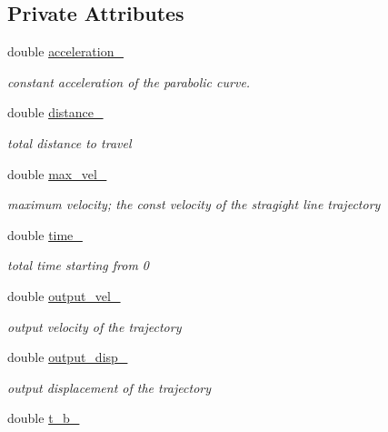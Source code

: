 \subsection*{Private Attributes}
\begin{DoxyCompactItemize}
\item 
double \hyperlink{classnubot_1_1para__traj__planning_ac2f88068a317316a2e483be7d75a71b8}{acceleration\-\_\-}
\begin{DoxyCompactList}\small\item\em constant acceleration of the parabolic curve. \end{DoxyCompactList}\item 
double \hyperlink{classnubot_1_1para__traj__planning_a6115be17c446c1a2437b5575baf3f5a8}{distance\-\_\-}
\begin{DoxyCompactList}\small\item\em total distance to travel \end{DoxyCompactList}\item 
double \hyperlink{classnubot_1_1para__traj__planning_a1ae8b889bdbb7716e9fbb5821328e4d1}{max\-\_\-vel\-\_\-}
\begin{DoxyCompactList}\small\item\em maximum velocity; the const velocity of the stragight line trajectory \end{DoxyCompactList}\item 
double \hyperlink{classnubot_1_1para__traj__planning_a06fe0c4fbd1afaa2a33672a85705410a}{time\-\_\-}
\begin{DoxyCompactList}\small\item\em total time starting from 0 \end{DoxyCompactList}\item 
double \hyperlink{classnubot_1_1para__traj__planning_ae57f0165c2b073b880bf4827bdd76204}{output\-\_\-vel\-\_\-}
\begin{DoxyCompactList}\small\item\em output velocity of the trajectory \end{DoxyCompactList}\item 
double \hyperlink{classnubot_1_1para__traj__planning_a9095bac66ff724f1b9b9c366546f2b36}{output\-\_\-disp\-\_\-}
\begin{DoxyCompactList}\small\item\em output displacement of the trajectory \end{DoxyCompactList}\item 
double \hyperlink{classnubot_1_1para__traj__planning_a89b8a9abfcb47b34ac861127fe26b8ca}{t\-\_\-b\-\_\-}

\end{DoxyCompactItemize}
